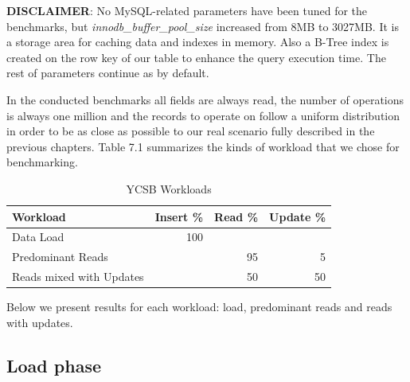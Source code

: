 \bigskip

\textbf{DISCLAIMER}: No MySQL-related parameters have been tuned for the benchmarks, but \textit{innodb\_buffer\_pool\_size} increased from 8MB to 3027MB. It is a storage area for caching data and indexes in memory. Also a B-Tree index is created on the row key of our table to enhance the query execution time. The rest of parameters continue as by default.

\bigskip

In the conducted benchmarks all fields are always read, the number of operations is always one million and the records to operate on follow a uniform distribution in order to be as close as possible to our real scenario fully described in the previous chapters. Table 7.1 summarizes the kinds of workload that we chose for benchmarking.

\begin{table}[htbp]

\begin{center}
\begin{tabular}{|l|l|l|l|}
\hline
Workload & Insert \% & Read \% & Update \% \\ \hline
Data Load & \multicolumn{1}{r|}{100} &  &  \\ \hline
Predominant Reads &  & \multicolumn{1}{r|}{95} & \multicolumn{1}{r|}{5} \\ \hline
Reads mixed with Updates &  & \multicolumn{1}{r|}{50} & \multicolumn{1}{r|}{50} \\ \hline
\end{tabular}
\caption{YCSB Workloads}
\end{center}

\label{Table YCSB Workloads.}
\end{table}

\par
Below we present results for each workload: load, predominant reads and reads with updates.


\subsection{Load phase}


